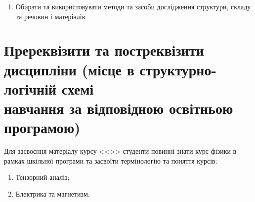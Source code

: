 \documentclass{Syllabus}
\begin{document}
\begin{enumerate}
    \item [ПРН 14:] Обирати та використовувати методи та засоби дослідження структури, складу та речовин і матеріалів.
\end{enumerate}


\section{Пререквізити та постреквізити дисципліни (місце в структурно-логічній схемі\\ навчання за відповідною освітньою програмою)}


Для засвоєння матеріалу курсу <<\discipline>> студенти повинні знати курс фізики в рамках шкільної програми та засвоїти термінологію та поняття курсів:
\begin{enumerate}
    \item Тензорний аналіз;
    \item Електрика та магнетизм.
\end{enumerate}
\end{document}
